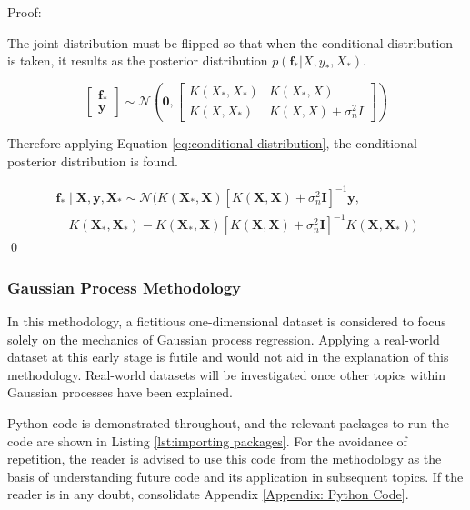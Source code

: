 \documentclass[12pt,a4paper]{article}
\begin{document}
Proof:

The joint distribution must be flipped so that when the conditional distribution is taken, it results as the posterior distribution \(p(\mathbf{f}_*|X, y_*, X_*)\).

\begin{equation*}
\begin{bmatrix}
\mathbf{f}_* \\
\mathbf{y}
\end{bmatrix}
\sim \mathcal{N}\left(
\mathbf{0},
\begin{bmatrix}
K(X_*, X_*) &  K(X_*, X) \\
K(X, X_*) & K(X, X) + \sigma_n^2 I
\end{bmatrix}
\right)
\end{equation*}

Therefore applying Equation \eqref{eq:conditional distribution}, the conditional posterior distribution is found.

\begin{equation*}
\begin{aligned}
\mathbf{f}_* \mid \mathbf{X}, \mathbf{y}, \mathbf{X}_* \sim \mathcal{N}(K(\mathbf{X}_*, \mathbf{X})[K(\mathbf{X}, \mathbf{X}) + \sigma_n^2 \mathbf{I}]^{-1} \mathbf{y}, \\ \quad K(\mathbf{X}_*, \mathbf{X}_*) - K(\mathbf{X}_*, \mathbf{X})[K(\mathbf{X}, \mathbf{X}) + \sigma_n^2 \mathbf{I}]^{-1} K(\mathbf{X}, \mathbf{X}_*))  
\end{aligned}
\end{equation*}  
\hfill \qed

\subsubsection{Gaussian Process Methodology}
\label{sec:methodology}

In this methodology, a fictitious one-dimensional dataset is considered to focus solely on the mechanics of Gaussian process regression. Applying a real-world dataset at this early stage is futile and would not aid in the explanation of this methodology. Real-world datasets will be investigated once other topics within Gaussian processes have been explained. 

Python code is demonstrated throughout, and the relevant packages to run the code are shown in Listing \ref{lst:importing packages}. For the avoidance of repetition, the reader is advised to use this code from the methodology as the basis of understanding future code and its application in subsequent topics. If the reader is in any doubt, consolidate Appendix \ref{Appendix: Python Code}.
\end{document}
